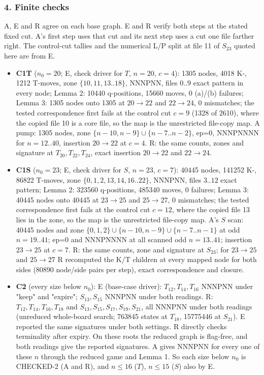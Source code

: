 \subsubsection*{4. Finite checks}
A, E and R agree on each base graph. E and R verify both steps at the stated fixed cut. A's first step uses that cut and its next step uses a cut one file farther right. The control-cut tallies and the numerical L/P split at file 11 of $S_{23}$ quoted here are from E.

\begin{itemize}
\item \textbf{C1T} ($n_0=20$; E, check driver for $T$, $n=20$, $c=4$): 1305 nodes, 4018 K-, 1212 T-moves, zone $\{10,11,13..18\}$, NNNPNN, files $0..9$ exact pattern in every node; Lemma 2: 10440 q-positions, 15660 moves, 0 (a)/(b) failures; Lemma 3: 1305 nodes onto 1305 at $20\to22$ and $22\to24$, 0 mismatches; the tested correspondence first fails at the control cut $c=9$ (1328 of 2610), where the copied file 10 is a core file, so the map is the unrestricted file-copy map. A pump: 1305 nodes, zone $\{n-10,n-9\}\cup\{n-7..n-2\}$, ep=0, NNNPNNNN for $n=12..40$, insertion $20\to22$ at $c=4$. R: the same counts, zones and signature at $T_{20},T_{22},T_{24}$, exact insertion $20\to22$ and $22\to24$.
\item \textbf{C1S} ($n_0=23$; E, check driver for $S$, $n=23$, $c=7$): 40445 nodes, 141252 K-, 86822 T-moves, zone $\{0,1,2,13,14,16..22\}$, NNNPNN, files $3..12$ exact pattern; Lemma 2: 323560 q-positions, 485340 moves, 0 failures; Lemma 3: 40445 nodes onto 40445 at $23\to25$ and $25\to27$, 0 mismatches; the tested correspondence first fails at the control cut $c=12$, where the copied file 13 lies in the zone, so the map is the unrestricted file-copy map. A's $S$ scan: 40445 nodes and zone $\{0,1,2\}\cup\{n-10,n-9\}\cup\{n-7..n-1\}$ at odd $n=19..41$; ep=0 and NNNPNNNN at all scanned odd $n=13..41$; insertion $23\to25$ at $c=7$. R: the same counts, zone and signature at $S_{23}$; for $23\to25$ and $25\to27$ R recomputed the K/T children at every mapped node for both sides (80890 node/side pairs per step), exact correspondence and closure.
\item \textbf{C2} (every size below $n_0$): E (base-case driver): $T_{12},T_{14},T_{16}$ NNNPNN under "keep" and "expire"; $S_{13},S_{15}$ NNNPNN under both readings. R: $T_{12},T_{14},T_{16},T_{18}$ and $S_{13},S_{15},S_{17},S_{19},S_{21}$, all NNNPNN under both readings (unreduced whole-board search; 763845 states at $T_{18}$, 15775446 at $S_{21}$). E reported the same signatures under both settings. R directly checks terminality after expiry. On these roots the reduced graph is flag-free, and both readings give the reported signatures. A gives NNNPNN for every one of these $n$ through the reduced game and Lemma 1. So each size below $n_0$ is CHECKED-2 (A and R), and $n\le16$ ($T$), $n\le15$ ($S$) also by E.
\end{itemize}

